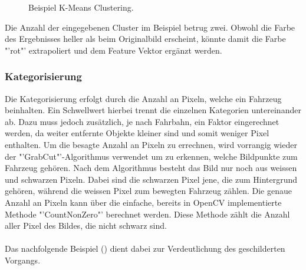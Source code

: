 {\begin{figure}[H]
  \centering
  \caption{Beispiel K-Means Clustering.}
  \label{bClustering}
\end{figure}

Die Anzahl der eingegebenen Cluster im Beispiel betrug zwei. Obwohl die Farbe des Ergebnisses heller als beim Originalbild erscheint, könnte damit die Farbe "'rot"' extrapoliert und dem Feature Vektor ergänzt werden. \cite{GrabCut, Clustering}

\subsubsection{Kategorisierung}
Die Kategorisierung erfolgt durch die Anzahl an Pixeln, welche ein Fahrzeug beinhalten. Ein Schwellwert hierbei trennt die einzelnen Kategorien untereinander ab. Dazu muss jedoch zusätzlich, je nach Fahrbahn, ein Faktor eingerechnet werden, da weiter entfernte Objekte kleiner sind und somit weniger Pixel enthalten. Um die besagte Anzahl an Pixeln zu errechnen, wird vorrangig wieder der "'GrabCut"'-Algorithmus verwendet um zu erkennen, welche Bildpunkte zum Fahrzeug gehören. Nach dem Algorithmus besteht das Bild nur noch aus weissen und schwarzen Pixeln. Dabei sind die schwarzen Pixel jene, die zum Hintergrund gehören, während die weissen Pixel zum bewegten Fahrzeug zählen. Die genaue Anzahl an Pixeln kann über die einfache, bereits in OpenCV implementierte Methode "'CountNonZero"' berechnet werden. Diese Methode zählt die Anzahl aller Pixel des Bildes, die nicht schwarz sind.\\\\
Das nachfolgende Beispiel () dient dabei zur Verdeutlichung des geschilderten Vorgangs.

}
